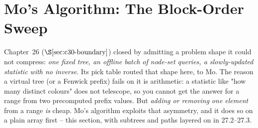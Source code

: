 \section{Mo's Algorithm: The Block-Order Sweep}\label{sec:c21-moengine}

\begin{previouslybox}
Chapter~26 (\(\secref{c30-boundary}\)) closed by admitting a problem shape it
could not compress: \emph{one fixed tree, an offline batch of node-set queries, a
slowly-updated statistic with no inverse}.  Its pick table routed that shape here,
to Mo.  The reason a virtual tree (or a Fenwick prefix) fails on it is arithmetic:
a statistic like "how many distinct colours" does not telescope, so you cannot get
the answer for a range from two precomputed prefix values.  But \emph{adding or
removing one element} from a range \emph{is} cheap.  Mo's algorithm exploits that
asymmetry, and it does so on a plain array first -- this section, with subtrees and
paths layered on in 27.2--27.3.
\end{previouslybox}

